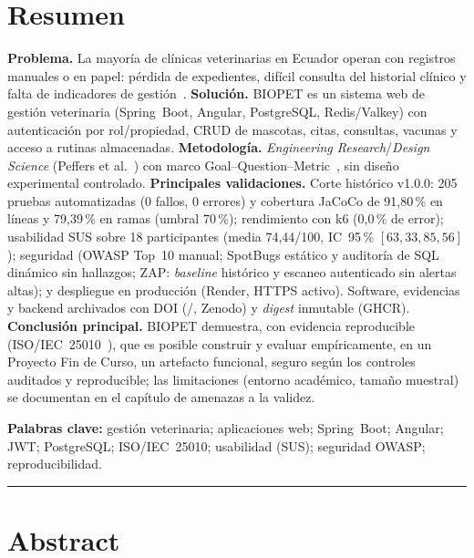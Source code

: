 \chapter*{Resumen}

\textbf{Problema.} La mayor\'ia de cl\'inicas veterinarias en Ecuador
operan con registros manuales o en papel: p\'erdida de expedientes,
dif\'icil consulta del historial cl\'inico y falta de indicadores de
gesti\'on~\cite{cedeno2021veterinaria}. \textbf{Soluci\'on.} BIOPET es un
sistema web de gesti\'on veterinaria (Spring~Boot, Angular, PostgreSQL,
Redis/Valkey) con autenticaci\'on por rol/propiedad, CRUD de mascotas,
citas, consultas, vacunas y acceso a rutinas almacenadas.
\textbf{Metodolog\'ia.} \emph{Engineering Research}/\emph{Design
Science} (Peffers et al.~\cite{peffers2007dsrm}) con marco
Goal--Question--Metric~\cite{vansolingen2002gqm}, sin dise\~no
experimental controlado. \textbf{Principales validaciones.} Corte
hist\'orico v1.0.0: 205 pruebas automatizadas (0 fallos, 0 errores) y
cobertura JaCoCo de 91{,}80\,\% en l\'ineas y 79{,}39\,\% en ramas
(umbral 70\,\%); rendimiento con k6
(0{,}0\,\% de error); usabilidad SUS sobre 18 participantes (media
74{,}44/100, IC~95\,\% $[63{,}33, 85{,}56]$); seguridad (OWASP
Top~10 manual; SpotBugs est\'atico y auditor\'ia de SQL din\'amico sin
hallazgos; ZAP: \emph{baseline} hist\'orico y escaneo autenticado sin
alertas altas); y despliegue en producci\'on (Render,
HTTPS activo). Software, evidencias y backend archivados con DOI
(\texttt{\doisoftware}/\texttt{\doidataset}, Zenodo) y \emph{digest}
inmutable (GHCR). \textbf{Conclusi\'on
principal.} BIOPET demuestra, con evidencia reproducible
(ISO/IEC~25010~\cite{iso25010-2011}), que es posible construir y evaluar
emp\'iricamente, en un Proyecto Fin de Curso,
un artefacto funcional, seguro seg\'un los controles auditados y
reproducible; las limitaciones (entorno acad\'emico, tama\~no muestral)
se documentan en el cap\'itulo de amenazas a la validez.

\textbf{Palabras clave:} gesti\'on veterinaria; aplicaciones web;
Spring~Boot; Angular; JWT; PostgreSQL; ISO/IEC~25010; usabilidad (SUS);
seguridad OWASP; reproducibilidad.

\bigskip
\hrule
\bigskip

\chapter*{Abstract}

